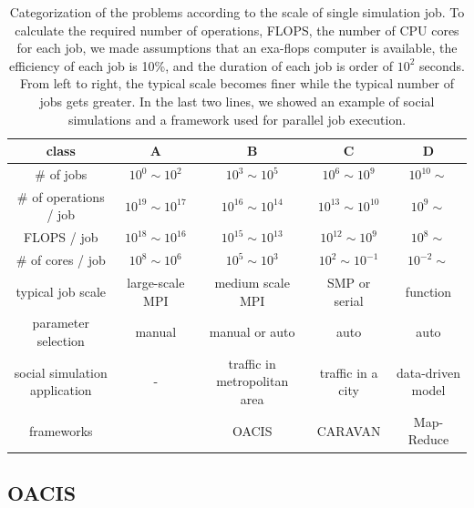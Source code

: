 \begin{table}[htb]
  \caption{Categorization of the problems according to the scale of single simulation job.
  To calculate the required number of operations, FLOPS, the number of CPU cores for each job, we made assumptions that an exa-flops computer is available, the efficiency of each job is 10\%, and the duration of each job is order of $10^2$ seconds.
  From left to right, the typical scale becomes finer while the typical number of jobs gets greater.
  In the last two lines, we showed an example of social simulations and a framework used for parallel job execution.
  }
  \label{tab:problem_scale}
  \centering
  \begin{tabular}{|c||c|c|c|c|} \hline 
    class      & A                & B                & C                & D \\ \hline \hline
    \# of jobs & $10^0 \sim 10^2$ & $10^3 \sim 10^5$ & $10^6 \sim 10^9$ & $10^{10} \sim$ \\ \hline
    \# of operations / job & $10^{19} \sim 10^{17}$ & $10^{16} \sim 10^{14}$ & $10^{13} \sim 10^{10}$ & $10^{9} \sim$ \\ \hline
    FLOPS / job & $10^{18} \sim 10^{16}$ & $10^{15} \sim 10^{13}$ & $10^{12} \sim 10^{9}$ & $10^{8} \sim$ \\ \hline
    \# of cores / job & $10^{8} \sim 10^{6}$ & $10^{5} \sim 10^{3}$ & $10^{2} \sim 10^{-1}$ & $10^{-2} \sim$ \\ \hline
    typical job scale & large-scale MPI & medium scale MPI & SMP or serial & function \\ \hline
    parameter selection & manual & manual or auto & auto & auto \\  \hline
    \multicolumn{1}{|p{.18\linewidth}||}{\hfil \centering social simulation application}
    & \multicolumn{1}{p{.18\linewidth}|}{\centering -}
    & \multicolumn{1}{p{.18\linewidth}|}{\centering traffic in metropolitan area}
    & \multicolumn{1}{p{.18\linewidth}|}{\centering traffic in a city}
    & \multicolumn{1}{p{.18\linewidth}|}{\centering data-driven model} \\ \hline
    frameworks & & OACIS & CARAVAN & Map-Reduce \\ 
    \hline
  \end{tabular}
\end{table}

\subsection{OACIS}
\label{ss:OACIS}

